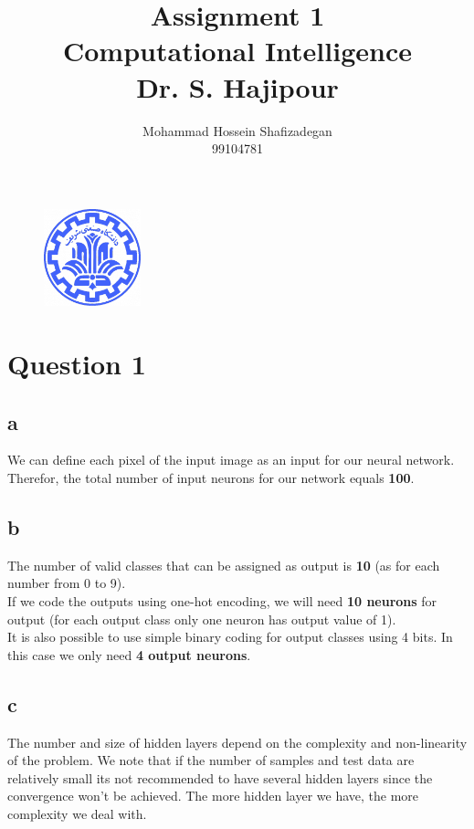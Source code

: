 \documentclass[]{article}
\author{
	Mohammad Hossein Shafizadegan\\
	99104781
}
\title{
	Assignment 1 \\
	Computational Intelligence  \\
	Dr. S. Hajipour
}
\begin{document}
	\begin{figure}
		\includegraphics[width=0.25\textwidth]{Fig/Sharif.png}
		\centering
	\end{figure}
	\maketitle
	\tableofcontents
	\newpage
	\section{Question 1}
	\subsection*{a}
	We can define each pixel of the input image as an input for our neural network. Therefor, the total number of input neurons for our network equals \textbf{100}.
	\subsection*{b}
	The number of valid classes that can be assigned as output is \textbf{10} (as for each number from 0 to 9).\\
	If we code the outputs using one-hot encoding, we will need \textbf{10 neurons} for output (for each output class only one neuron has output value of 1).\\
	It is also possible to use simple binary coding for output classes using 4 bits. In this case we only need \textbf{4 output neurons}.
	\subsection*{c}
	The number and size of hidden layers depend on the complexity and non-linearity of the problem. We note that if the number of samples and test data are relatively small its not recommended to have several hidden layers since the convergence won't be achieved. The more hidden layer we have, the more complexity we deal with.
	
\end{document}
